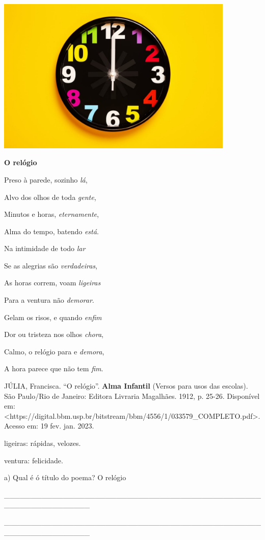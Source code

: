 \includegraphics[width=4.46875in,height=2.93485in]{media/image16.jpeg}

\textbf{O relógio}

Preso à parede, sozinho \emph{lá},

Alvo dos olhos de toda \emph{gente},

Minutos e horas, \emph{eternamente},

Alma do tempo, batendo \emph{está}.

Na intimidade de todo \emph{lar}

Se as alegrias são \emph{verdadeiras},

As horas correm, voam \emph{ligeiras}

Para a ventura não \emph{demorar}.

Gelam os risos, e quando \emph{enfim}

Dor ou tristeza nos olhos \emph{chora},

Calmo, o relógio para e \emph{demora},

A hora parece que não tem \emph{fim}.

JÚLIA, Francisca. ``O relógio''. \textbf{Alma Infantil} (Versos para
usos das escolas). São Paulo/Rio de Janeiro: Editora Livraria Magalhães.
1912, p. 25-26. Disponível em:
\textless{}https://digital.bbm.usp.br/bitstream/bbm/4556/1/033579\_COMPLETO.pdf\textgreater{}.
Acesso em: 19 fev. jan. 2023.

ligeiras: rápidas, velozes.

ventura: felicidade.

a) Qual é ó título do poema? O relógio

\_\_\_\_\_\_\_\_\_\_\_\_\_\_\_\_\_\_\_\_\_\_\_\_\_\_\_\_\_\_\_\_\_\_\_\_\_\_\_\_\_\_\_\_\_\_\_\_\_\_\_\_\_\_\_\_\_\_\_\_\_\_\_\_

\_\_\_\_\_\_\_\_\_\_\_\_\_\_\_\_\_\_\_\_\_\_\_\_\_\_\_\_\_\_\_\_\_\_\_\_\_\_\_\_\_\_\_\_\_\_\_\_\_\_\_\_\_\_\_\_\_\_\_\_\_\_\_\_

